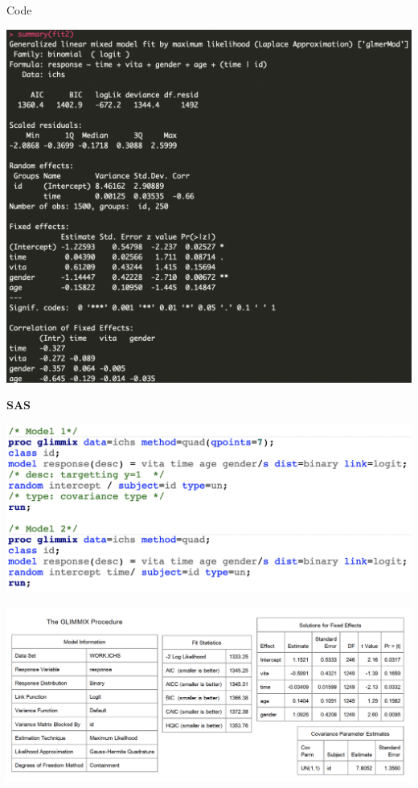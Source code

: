 \documentclass[9pt, xelatex]{beamer}
\begin{document}
{\begin{frame}[allowframebreaks]{Code}
		\framebreak
		
		\begin{center}
			\includegraphics[scale=0.33]{rfit2.png} 
		\end{center}
	
		 \framebreak
			
		\textbf{SAS}
		\vspace{4mm}
		
		\begin{center}
			\includegraphics[scale=0.4]{sascode.png} 
		\end{center}
	
		\framebreak
		
		\begin{center}
			\includegraphics[scale=0.4]{sasfit1.png} 
		\end{center}
	

\end{frame}}
\end{document}

